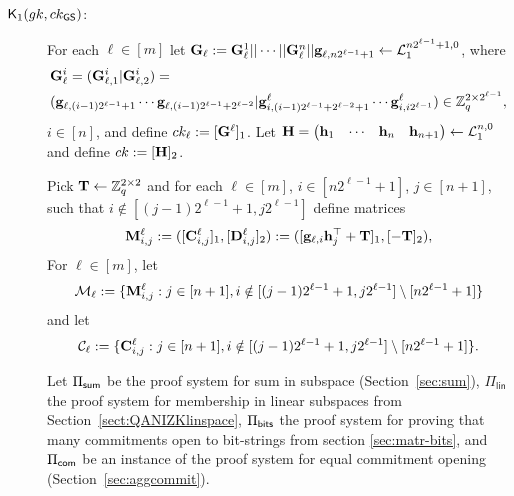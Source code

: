\begin{description}

\item[{\(\mathsf{K}_1({gk}, ck_{\mathsf{GS}})\)}:]
For each \(\ell\in [m]\) let \(\mathbf{{G}}_\ell:=\mathbf{{G}}^1_{\ell}||\cdots||\mathbf{{G}}^n_{\ell}||\mathbf{g}_{\ell,{n2^{\ell-1}+1}}\gets\mathcal{L}_1^{n2^{\ell-1}+1,0}\), where
\begin{align*}
&\mathbf{{G}}^i_{\ell}=
(\mathbf{{G}}^i_{\ell,1}|\mathbf{{G}}^i_{\ell,2})
=\\
&(\mathbf{g}_{\ell,(i-1)2^{\ell-1}+1}\cdots\mathbf{g}_{\ell, (i-1) 2^{\ell-1}+2^{\ell-2}}|\mathbf{g}^\ell_{i,(i-1)2^{\ell-1}+2^{\ell-2}+1}\cdots\mathbf{g}^\ell_{i,i2^{\ell-1}})
\in\mathbb{Z}_q^{2\times 2^{\ell-1}},
\end{align*}
 \(i\in  [n]\), and define \(ck_\ell:=[\mathbf{{G}}^\ell]_1\).
Let \(\mathbf{{H}}=\begin{pmatrix}\mathbf{h}_1&\cdots&\mathbf{h}_n&\mathbf{h}_{n+1}\end{pmatrix}\gets\mathcal{L}_1^{n,0}\) and define \(ck:=[\mathbf{{H}}]_2\). 

Pick \(\mathbf{{T}}\gets\mathbb{Z}_q^{2\times 2}\) and for each \(\ell\in[m]\), \( i\in [n2^{\ell-1}+1]\), \(j\in  [n+1]\), such that \(i\notin [(j-1)2^{\ell-1}+1,j2^{\ell-1}]\) define matrices
\[\mathbf{{M}}^\ell_{i,j}:=([\mathbf{{C}}_{i,j}^\ell]_1,[\mathbf{{D}}_{i,j}^\ell]_2):=([\mathbf{g}_{\ell,i}\mathbf{h}_j^{\top}+\mathbf{{T}}]_1,[-\mathbf{{T}}]_2),\]
For \(\ell\in [m]\), let
$$
\mathcal{M}_\ell:=\{\mathbf{{M}}^\ell_{i,j}:j\in[n+1],i\notin[(j-1)2^{\ell-1}+1,j2^{\ell-1}]\setminus[n2^{\ell-1}+1]\}$$
and let
$$
\mathcal{C}_\ell:=\{\mathbf{{C}}^\ell_{i,j}:j\in[n+1],i\notin[(j-1)2^{\ell-1}+1,j2^{\ell-1}]\setminus[n2^{\ell-1}+1]\}.
$$

Let \(\Pi_{\mathsf{sum}}\) be the proof system for sum in subspace 
(Section~\ref{sec:sum}), \(\Pi_\mathsf{lin}\) the proof system for membership in linear subspaces from Section~\ref{sect:QANIZKlinspace}, \(\Pi_{\mathsf{bits}}\) the proof system for proving that many commitments open to bit-strings from section \ref{sec:matr-bits}, and \(\Pi_{\mathsf{com}}\)
be an instance of the proof system for equal commitment opening (Section~\ref{sec:aggcommit}).


\end{description}
